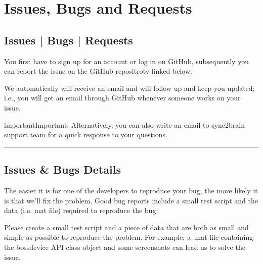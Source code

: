 \documentclass[letterpaper,10pt,english]{sphinxmanual}
\begin{document}
\chapter{Issues, Bugs and Requests}
\label{\detokenize{7_issues_bugs_requests:issues-bugs-and-requests}}\label{\detokenize{7_issues_bugs_requests::doc}}

\section{Issues | Bugs | Requests}
\label{\detokenize{7_issues_bugs_requests:issues-bugs-requests}}
\sphinxAtStartPar
You first have to sign up for an account or log in on GitHub, subsequently you can report the issue on the GitHub repositroty linked below:

\begin{sphinxVerbatim}[commandchars=\\\{\}]
\end{sphinxVerbatim}

\sphinxAtStartPar
We automatically will receive an email and will follow up and keep you updated; i.e., you will get an email through GitHub whenever someone works on your issue.

\begin{sphinxadmonition}{important}{Important:}
\sphinxAtStartPar
Alternatively, you can also write an email to sync2brain support team for a quick response to your questions.
\end{sphinxadmonition}


\bigskip\hrule\bigskip



\section{Issues \& Bugs Details}
\label{\detokenize{7_issues_bugs_requests:issues-bugs-details}}
\sphinxAtStartPar
The easier it is for one of the developers to reproduce your bug, the more likely it is that we’ll fix the problem. Good bug reports include a small test script and the data (i.e. mat file) required to reproduce the bug.

\sphinxAtStartPar
Please create a small test script and a piece of data that are both as small and simple as possible to reproduce the problem. For example: a .mat file containing the bossdevice API class object and some screenshots can lead us to solve the issue.
\end{document}
